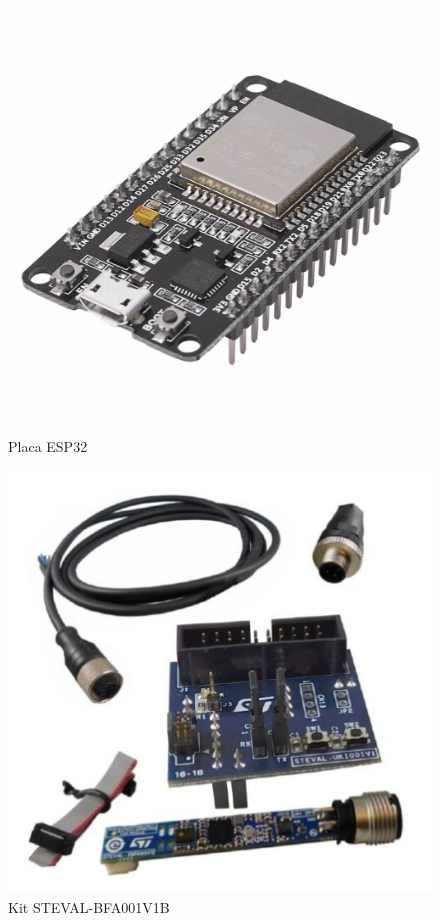 \documentclass[
	article,			%
	12pt,				%
	oneside,			%
	a4paper,			%
	section=TITLE,		%
	subsection=TITLE,	%
	english,			%
	brazil,				%
	sumario=tradicional
	]{abntex2}
\begin{document}
\begin{figure}[H]
    \centering
    \includegraphics[scale=0.15]{placa_doit_esp32_-_esp-wroom-32_-_wifi_bluetooth.jpg}
    \caption{Placa ESP32}
    \label{fig:esp}
\end{figure}

\begin{figure}[H]
    \centering
    \includegraphics[scale=0.3]{steaval.jpg}
    \caption{Kit STEVAL-BFA001V1B }
    \label{fig:kit}
\end{figure}
\end{document}
